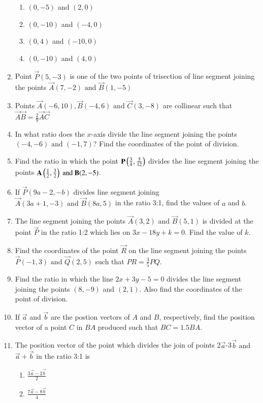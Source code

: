 \begin{enumerate}[label=\thesubsection.\arabic*,ref=\thesubsection.\theenumi]
\begin{enumerate}
	\item$(0,-5)$ and $(2,0)$
	\item$(0,-10)$ and $(-4,0)$
	\item$(0,4)$ and  $(-10,0)$
	\item$(0,-10)$ and $(4,0)$
\end{enumerate}
\item Point $\vec{P}(5,-3)$ is one of the two points of trisection of line segment joining the points $\vec{A}(7,-2)\text{ and }\vec{B}(1,-5)$
\item Points $\vec{A}(-6,10),\vec{B}(-4,6) \text{ and } \vec{C}(3,-8)$ are collinear such that $\vec{A}\vec{B}=  \frac{2}{9}\vec{A}\vec{C}$
\item In what ratio does the $x$-axis divide the line segment joining the points $(-4,-6)\text{ and }(-1,7)$? Find the coordinates of the point of division.
\item Find the ratio in which the point $\mathbf{P}\left(\frac{3}{4},\frac{5}{12}\right)$ divides the line segment joining the points $\mathbf{A}\left(\frac{1}{2},\frac{3}{2}\right)\text{ and } \mathbf{B}(2,-5)$.
\item If $\vec{P}(9a-2,-b)$ divides line segment joining $\vec{A}(3a+1,-3)\text{ and }\vec{B}(8a,5)$ in the ratio 3:1, find the values of $a$ and $b$.
\item The line segment joining the points $\vec{A}(3,2)\text{ and }\vec{B}(5,1)$ is divided at the point $\vec{P}$ in the ratio 1:2 which lies on $3x-18y+k=0$. Find the value of $k$.  
\item Find the coordinates of the point $\vec{R}$ on the line segment joining the points $\vec{P}(-1,3)\text{ and }\vec{Q}(2,5)$ such that $PR=\frac{3}{5}PQ$.
\item Find the ratio in which the line $2x+3y-5=0$ divides the line segment joining the points $(8,-9)$ and $(2,1)$. Also find the coordinates of the point of division.
\item If $\vec{a}$ and $\vec{b}$ are the postion vectors of $A$ and $B$, respectively, find the position vector of a point $C$ in $BA$ produced such that $BC=1.5BA$.
\item The position vector of the point which divides the join of points 2$\vec{a}$-3$\vec{b}$ $\text{and}$ $\vec{a}+\vec{b}$ in the ratio 3:1 is
	\begin{enumerate}
\item $\frac{3\vec{a}-2\vec{b}}{2}$
\item $\frac{7\vec{a}-8\vec{b}}{4}$

\end{enumerate}
\end{enumerate}

